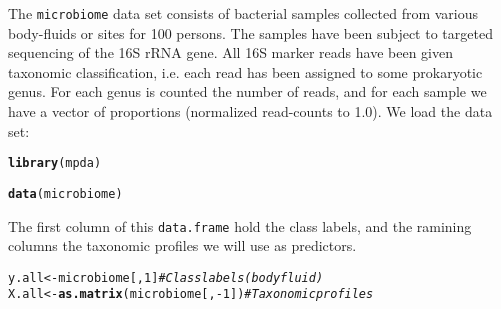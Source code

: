 \documentclass[a4paper]{article}\usepackage[]{graphicx}\usepackage[]{color}
\makeatletter
\newcommand{\hlnum}[1]{\textcolor[rgb]{0.686,0.059,0.569}{#1}}%
\newcommand{\hlcom}[1]{\textcolor[rgb]{0.678,0.584,0.686}{\textit{#1}}}%
\newcommand{\hlopt}[1]{\textcolor[rgb]{0,0,0}{#1}}%
\newcommand{\hlstd}[1]{\textcolor[rgb]{0.345,0.345,0.345}{#1}}%
\newcommand{\hlkwb}[1]{\textcolor[rgb]{0.69,0.353,0.396}{#1}}%
\newcommand{\hlkwd}[1]{\textcolor[rgb]{0.737,0.353,0.396}{\textbf{#1}}}%
\newenvironment{kframe}{%
 \def\at@end@of@kframe{}%
 \ifinner\ifhmode%
  \def\at@end@of@kframe{\end{minipage}}%
  \begin{minipage}{\columnwidth}%
 \fi\fi%
 \def\FrameCommand##1{\hskip\@totalleftmargin \hskip-\fboxsep
 \colorbox{shadecolor}{##1}\hskip-\fboxsep
     \hskip-\linewidth \hskip-\@totalleftmargin \hskip\columnwidth}%
 \MakeFramed {\advance\hsize-\width
   \@totalleftmargin\z@ \linewidth\hsize
   \@setminipage}}%
 {\par\unskip\endMakeFramed%
 \at@end@of@kframe}
\newenvironment{knitrout}{}{} %
\makeatother
\begin{document}
The \texttt{microbiome} data set consists of bacterial samples collected from various body-fluids or sites for 100 persons. The samples have been subject to targeted sequencing of the 16S rRNA gene. All 16S marker reads have been given taxonomic classification, i.e. each read has been assigned to some prokaryotic genus. For each genus is counted the number of reads, and for each sample we have a vector of proportions (normalized read-counts to 1.0). We load the data set:
\begin{knitrout}
\color{fgcolor}\begin{kframe}
\begin{alltt}
\hlkwd{library}\hlstd{(mpda)}
\end{alltt}


{\ttfamily\noindent\itshape\color{messagecolor}{\#\# Loading required package: pls}}

{\ttfamily\noindent\itshape\color{messagecolor}{\#\# \\\#\# Attaching package: 'pls'}}

{\ttfamily\noindent\itshape\color{messagecolor}{\#\# The following object is masked from 'package:stats':\\\#\# \\\#\#\ \ \ \  loadings}}

{\ttfamily\noindent\itshape\color{messagecolor}{\#\# Loading required package: MASS}}\begin{alltt}
\hlkwd{data}\hlstd{(microbiome)}
\end{alltt}
\end{kframe}
\end{knitrout}

The first column of this \texttt{data.frame} hold the class labels, and the ramining columns the taxonomic profiles we will use as predictors.
\begin{knitrout}
\color{fgcolor}\begin{kframe}
\begin{alltt}
\hlstd{y.all} \hlkwb{<-} \hlstd{microbiome[,}\hlnum{1}\hlstd{]}             \hlcom{# Class labels (body fluid)}
\hlstd{X.all} \hlkwb{<-} \hlkwd{as.matrix}\hlstd{(microbiome[,}\hlopt{-}\hlnum{1}\hlstd{])} \hlcom{# Taxonomic profiles}
\end{alltt}
\end{kframe}
\end{knitrout}
\end{document}
